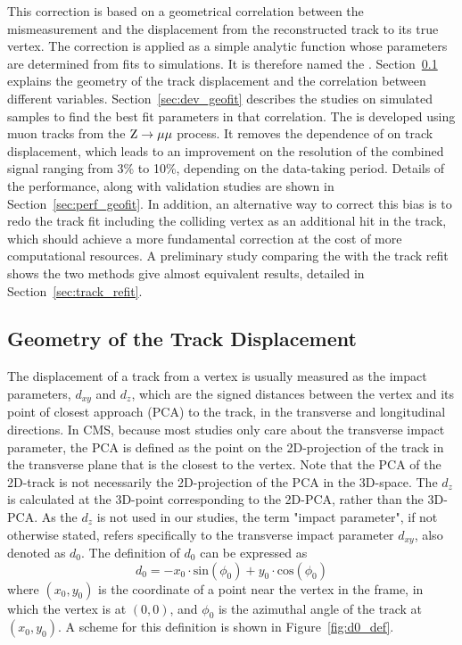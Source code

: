 This correction is based on a geometrical correlation between the \pt mismeasurement 
and the displacement from the reconstructed track to its true vertex.
The correction is applied as a simple analytic function whose parameters are determined from fits to simulations.
It is therefore named the \GeoFit.
Section~\ref{sec:d0_geometry} explains the geometry of the track displacement and the correlation between different variables.
Section~\ref{sec:dev_geofit} describes the studies on simulated samples to find the best fit parameters in that correlation.
The \GeoFit is developed using muon tracks from the $\mathrm{Z} \to \mu\mu$ process.
It removes the dependence of \mmm on track displacement, which leads to an 
improvement on the \mmm resolution of the combined signal ranging from 3\% to 10\%, depending on the data-taking period.
Details of the \GeoFit performance, along with validation studies are shown in Section~\ref{sec:perf_geofit}.
In addition, an alternative way to correct this \pt bias is to redo the track fit including the colliding vertex as an additional hit in the track, 
which should achieve a more fundamental correction at the cost of more computational resources.
A preliminary study comparing the \GeoFit with the track refit shows the two methods give almost equivalent results,
detailed in Section~\ref{sec:track_refit}.


\subsection{Geometry of the Track Displacement}\label{sec:d0_geometry}

The displacement of a track from a vertex is usually measured as the impact parameters, $d_{xy}$ and $d_{z}$,
which are the signed distances between the vertex and its point of closest approach (PCA) to the track, in the transverse and longitudinal directions.
In CMS, because most studies only care about the transverse impact parameter, 
the PCA is defined as the point on the 2D-projection of the track in the transverse plane that is the closest to the vertex.
Note that the PCA of the 2D-track is not necessarily the 2D-projection of the PCA in the 3D-space. 
The $d_{z}$ is calculated at the 3D-point corresponding to the 2D-PCA, rather than the 3D-PCA.
As the $d_{z}$ is not used in our studies, the term "impact parameter", if not otherwise stated,
refers specifically to the transverse impact parameter $d_{xy}$, also denoted as $d_{0}$.
The definition of $d_0$ can be expressed as 
\begin{equation}\label{eq:d0_def}
  d_0 = -x_{0} \cdot \text{sin}(\phi_{0}) + y_{0} \cdot \text{cos}(\phi_{0})
\end{equation}
where $(x_{0}, y_{0})$ is the coordinate of a point near the vertex in the frame, in which the vertex is at $(0,0)$, 
and $\phi_{0}$ is the azimuthal angle of the track at $(x_{0}, y_{0})$.
A scheme for this definition is shown in Figure~\ref{fig:d0_def}.

